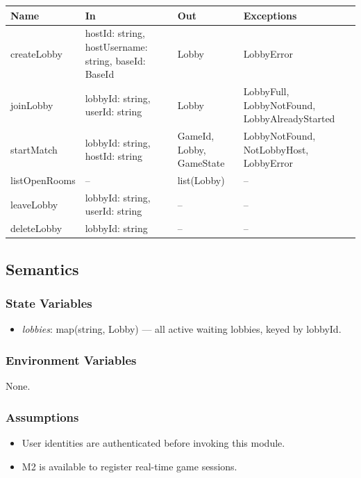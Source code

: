 \documentclass[12pt, titlepage]{article}
\begin{document}
\begin{center}
    \begin{tabular}{p{3.5cm} p{5cm} p{3cm} p{3.5cm}}
        \toprule
        \textbf{Name} & \textbf{In} & \textbf{Out} & \textbf{Exceptions} \\
        \midrule
        createLobby & hostId: string, hostUsername: string, baseId: BaseId & Lobby & LobbyError \\
        joinLobby & lobbyId: string, userId: string & Lobby & LobbyFull, LobbyNotFound, LobbyAlreadyStarted \\
        startMatch & lobbyId: string, hostId: string & GameId, Lobby, GameState & LobbyNotFound, NotLobbyHost, LobbyError \\
        listOpenRooms & -- & list(Lobby) & -- \\
        leaveLobby & lobbyId: string, userId: string & -- & -- \\
        deleteLobby & lobbyId: string & -- & -- \\
        \bottomrule
    \end{tabular}
\end{center}

\subsection{Semantics}

\subsubsection{State Variables}
\begin{itemize}
    \item \textit{lobbies}: map(string, Lobby) --- all active waiting lobbies, keyed by lobbyId.
\end{itemize}

\subsubsection{Environment Variables}
None.

\subsubsection{Assumptions}
\begin{itemize}
    \item User identities are authenticated before invoking this module.
    \item M2 is available to register real-time game sessions.
\end{itemize}
\end{document}
